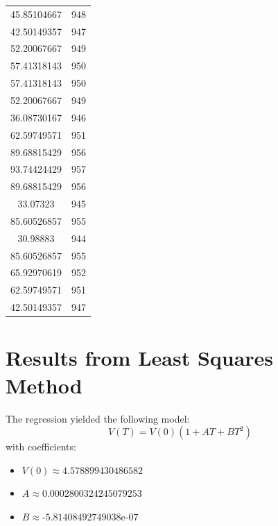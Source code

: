 \documentclass[journal,onecolumn]{IEEEtran}
\begin{document}
\begin{table}[h]
\begin{minipage}[b]{0.45\textwidth}
\begin{tabular}{@{}cc@{}}
				45.85104667              & 948        \\
				42.50149357              & 947        \\
				52.20067667              & 949        \\
				57.41318143              & 950        \\
				57.41318143              & 950        \\
				52.20067667              & 949        \\
				36.08730167              & 946        \\
				62.59749571              & 951        \\
				89.68815429              & 956        \\
				93.74424429              & 957        \\
				89.68815429              & 956        \\
				33.07323                 & 945        \\
				85.60526857              & 955        \\
				30.98883                 & 944        \\
				85.60526857              & 955        \\
				65.92970619              & 952        \\
				62.59749571              & 951        \\
				42.50149357              & 947        \\ \bottomrule
			\end{tabular}
		\end{minipage}
	\end{table}
	
	
	\section{Results from Least Squares Method}
	The regression yielded the following model:
	\begin{equation}
		V(T) = V(0) \left( 1 + AT + BT^2 \right)
	\end{equation}
	with coefficients:
	\begin{itemize}
		\item \( V(0) \approx \text{4.578899430486582} \)
		\item \( A \approx \text{0.0002800324245079253} \)
		\item \( B \approx \text{-5.81408492749038e-07} \)
	\end{itemize}
	
\end{document}
